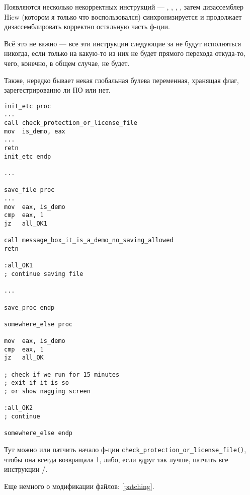 Появляются несколько некорректных инструкций --- , , , ,
затем дизассемблер Hiew (котором я только что воспользовался)
синхронизируется и продолжает дизассемблировать корректно остальную часть ф-ции.

Всё это не важно --- все эти инструкции следующие за  не будут исполняться никогда, если только на какую-то из них не будет прямого
перехода откуда-то, чего, конечно, в общем случае, не будет.

\myhrule{}

Также, нередко бывает некая глобальная булева переменная, хранящая флаг, зарегестрированно ли ПО или нет.

\begin{lstlisting}[style=customasmx86]
init_etc proc
...
call check_protection_or_license_file
mov  is_demo, eax
...
retn
init_etc endp

...

save_file proc
...
mov  eax, is_demo
cmp  eax, 1
jz   all_OK1

call message_box_it_is_a_demo_no_saving_allowed
retn

:all_OK1
; continue saving file

...

save_proc endp

somewhere_else proc

mov  eax, is_demo
cmp  eax, 1
jz   all_OK

; check if we run for 15 minutes
; exit if it is so
; or show nagging screen

:all_OK2
; continue

somewhere_else endp
\end{lstlisting}

Тут можно или патчить начало ф-ции \verb|check_protection_or_license_file()|,
чтобы она всегда возвращала 1, либо, если вдруг так лучше,
патчить все инструкции /.

Еще немного о модификации файлов: \ref{patching}.

